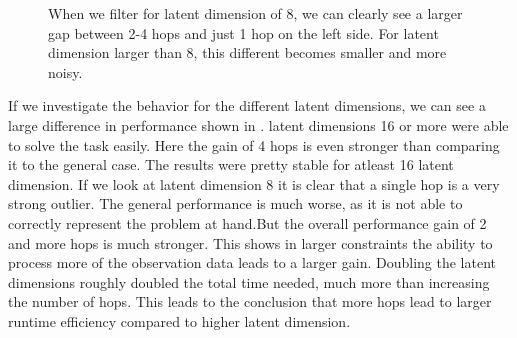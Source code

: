 \begin{figure}[htp]
    \centering
    \hspace{1cm}                       
    \caption{When we filter for latent dimension of 8, we can clearly see a larger gap between 2-4 hops and just 1 hop on the left side. For latent dimension larger than 8, this different becomes smaller and more noisy.}
    \label{fig:proof_of_concept_rendezvous_ld}
\end{figure}

If we investigate the behavior for the different latent dimensions, we can see a large difference in performance shown in . latent dimensions 16 or more were able to solve the task easily. Here the gain of 4 hops is even stronger than comparing it to the general case. The results were pretty stable for atleast 16 latent dimension. If we look at latent dimension 8 it is clear that a single hop is a very strong outlier. The general performance is much worse, as it is not able to correctly represent the problem at hand.But the overall performance gain of 2 and more hops is much stronger. This shows in larger constraints the ability to process more of the observation data leads to a larger gain. Doubling the latent dimensions roughly doubled the total time needed, much more than increasing the number of hops. This leads to the conclusion that more hops lead to larger runtime efficiency compared to higher latent dimension.


